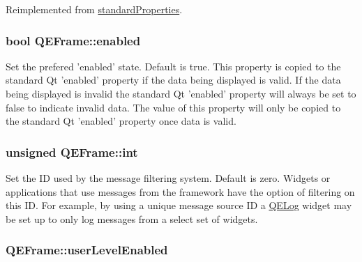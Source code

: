 Reimplemented from \hyperlink{classstandardProperties}{standardProperties}.

\hypertarget{classQEFrame_ad2c8724a8455c554dd24fc833e8f5ff7}{
\subsubsection[{enabled}]{\setlength{\rightskip}{0pt plus 5cm}bool QEFrame::enabled}}
\label{classQEFrame_ad2c8724a8455c554dd24fc833e8f5ff7}
Set the prefered 'enabled' state. Default is true. This property is copied to the standard Qt 'enabled' property if the data being displayed is valid. If the data being displayed is invalid the standard Qt 'enabled' property will always be set to false to indicate invalid data. The value of this property will only be copied to the standard Qt 'enabled' property once data is valid. \hypertarget{classQEFrame_a3fdb2e6df61c380f5dbae9c0d4fe2c97}{
\subsubsection[{int}]{\setlength{\rightskip}{0pt plus 5cm}unsigned QEFrame::int}}
\label{classQEFrame_a3fdb2e6df61c380f5dbae9c0d4fe2c97}
Set the ID used by the message filtering system. Default is zero. Widgets or applications that use messages from the framework have the option of filtering on this ID. For example, by using a unique message source ID a \hyperlink{classQELog}{QELog} widget may be set up to only log messages from a select set of widgets. \hypertarget{classQEFrame_af3d7163c6158e457d081c5de695bd064}{
\subsubsection[{userLevelEnabled}]{ QEFrame::userLevelEnabled}}
\label{classQEFrame_af3d7163c6158e457d081c5de695bd064}
